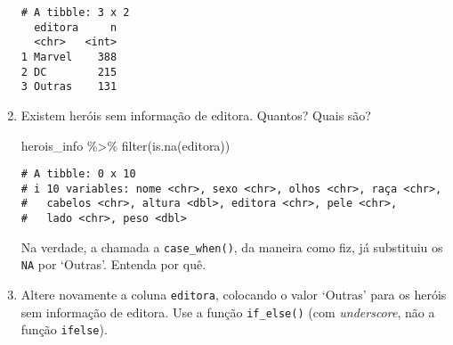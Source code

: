 \documentclass[
  letterpaper,
  DIV=11,
  numbers=noendperiod]{scrreprt}
\newenvironment{Shaded}{\begin{snugshade}}{\end{snugshade}}
\newcommand{\FunctionTok}[1]{\textcolor[rgb]{0.28,0.35,0.67}{#1}}
\newcommand{\NormalTok}[1]{\textcolor[rgb]{0.00,0.23,0.31}{#1}}
\newcommand{\SpecialCharTok}[1]{\textcolor[rgb]{0.37,0.37,0.37}{#1}}
\begin{document}
\begin{enumerate}
\begin{tcolorbox}
\begin{verbatim}
# A tibble: 3 x 2
  editora     n
  <chr>   <int>
1 Marvel    388
2 DC        215
3 Outras    131
\end{verbatim}

  \end{tcolorbox}
\item
  Existem heróis sem informação de editora. Quantos? Quais são?

  \begin{tcolorbox}[enhanced jigsaw, coltitle=black, colbacktitle=quarto-callout-tip-color!10!white, title=\textcolor{quarto-callout-tip-color}{\faLightbulb}\hspace{0.5em}{Resposta}, toprule=.15mm, leftrule=.75mm, opacityback=0, colback=white, arc=.35mm, breakable, bottomtitle=1mm, left=2mm, toptitle=1mm, titlerule=0mm, rightrule=.15mm, bottomrule=.15mm, opacitybacktitle=0.6, colframe=quarto-callout-tip-color-frame]

\begin{Shaded}
\begin{Highlighting}[]
\NormalTok{herois\_info }\SpecialCharTok{\%\textgreater{}\%} \FunctionTok{filter}\NormalTok{(}\FunctionTok{is.na}\NormalTok{(editora))}
\end{Highlighting}
\end{Shaded}

\begin{verbatim}
# A tibble: 0 x 10
# i 10 variables: nome <chr>, sexo <chr>, olhos <chr>, raça <chr>,
#   cabelos <chr>, altura <dbl>, editora <chr>, pele <chr>,
#   lado <chr>, peso <dbl>
\end{verbatim}

  Na verdade, a chamada a \texttt{case\_when()}, da maneira como fiz, já
  substituiu os \texttt{NA} por `Outras'. Entenda por quê.

  \end{tcolorbox}
\item
  Altere novamente a coluna \texttt{editora}, colocando o valor `Outras'
  para os heróis sem informação de editora. Use a função
  \texttt{if\_else()} (com \emph{underscore}, não a função
  \texttt{ifelse}).

  \begin{tcolorbox}[enhanced jigsaw, coltitle=black, colbacktitle=quarto-callout-tip-color!10!white, title=\textcolor{quarto-callout-tip-color}{\faLightbulb}\hspace{0.5em}{Resposta}, toprule=.15mm, leftrule=.75mm, opacityback=0, colback=white, arc=.35mm, breakable, bottomtitle=1mm, left=2mm, toptitle=1mm, titlerule=0mm, rightrule=.15mm, bottomrule=.15mm, opacitybacktitle=0.6, colframe=quarto-callout-tip-color-frame]


\end{tcolorbox}
\end{enumerate}
\end{document}
